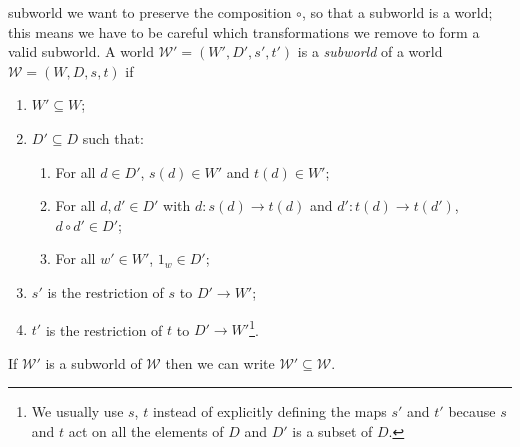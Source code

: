  subworld we want to preserve the composition $\circ$, so that a subworld is a world; this means we have to be careful which transformations we remove to form a valid subworld.
A world $\mathscr{W}' = (W', D', s', t')$ is a \emph{subworld} of a world $\mathscr{W} = (W, D, s, t)$ if
\begin{enumerate}
    \item $W' \subseteq W$;
    \item $D' \subseteq D$ such that:
    \begin{enumerate}
        \item For all $d \in D'$, $s(d) \in W'$ and $t(d) \in W'$;
        \item For all $d, d' \in D'$ with $d: s(d) \to t(d)$ and $d': t(d) \to t(d')$, $d \circ d' \in D'$;
        \item For all $w' \in W'$, $1_{w} \in D'$;
    \end{enumerate}
    \item $s'$ is the restriction of $s$ to $D' \to W'$;
    \item $t'$ is the restriction of $t$ to $D' \to W'$\footnote{
    We usually use $s$, $t$ instead of explicitly defining the maps $s'$ and $t'$ because $s$ and $t$ act on all the elements of $D$ and $D'$ is a subset of $D$.
    }.
\end{enumerate}

\begin{notation}
    If $\mathscr{W}'$ is a subworld of $\mathscr{W}$ then we can write $\mathscr{W}' \subseteq \mathscr{W}$.
\end{notation}

